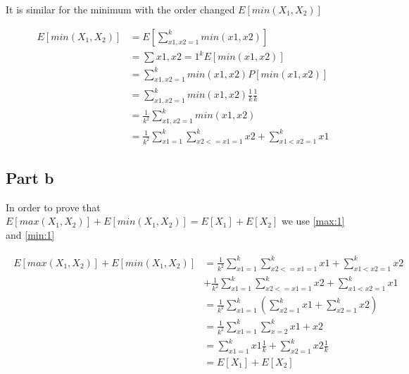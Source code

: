 \documentclass[12pt, a4paper]{article}
\begin{document}
It is similar for the minimum with the order changed $E[min(X_1,X_2)]$

\begin{subequations}
  \begin{align}
    E[min(X_1,X_2)] &= E\left[ \displaystyle\sum_{x1,x2=1}^{k} min(x1,x2) \right] \\
                    &= \displaystyle\sum{x1,x2=1}^{k} E[min(x1,x2)] \\
                    &= \displaystyle\sum_{x1,x2=1}^{k} min(x1,x2)P[min(x1,x2)] \\
                    &= \displaystyle\sum_{x1,x2=1}^{k} min(x1,x2)\frac{1}{k}\frac{1}{k} \\
                    &= \frac{1}{k^2} \displaystyle\sum_{x1,x2=1}^{k} min(x1,x2) \\
                    &= \frac{1}{k^2} \displaystyle\sum_{x1=1}^{k} \displaystyle\sum_{x2<=x1=1}^{k} x2 + \displaystyle\sum_{x1<x2=1}^{k} x1 \label{min:1}
  \end{align}
\end{subequations}


\subsection{Part b} \label{ex_13_part_b}

In order to prove that $E[max(X_1,X_2)] + E[min(X_1,X_2)] = E[X_1] + E[X_2]$ we
use \ref{max:1} and \ref{min:1}

\begin{subequations}
  \begin{align}
    \begin{split}
      E[max(X_1,X_2)] + E[min(X_1,X_2)] &= \frac{1}{k^2} \displaystyle\sum_{x1=1}^{k} \displaystyle\sum_{x2<=x1=1}^{k} x1 + \displaystyle\sum_{x1<x2=1}^{k} x2 \\
      & + \frac{1}{k^2} \displaystyle\sum_{x1=1}^{k} \displaystyle\sum_{x2<=x1=1}^{k} x2 + \displaystyle\sum_{x1<x2=1}^{k} x1 \\
                                      &= \frac{1}{k^2} \displaystyle\sum_{x1=1}^{k} \left( \displaystyle\sum_{x2=1}^{k} x1 + \displaystyle\sum_{x2=1}^{k} x2 \right) \\
                                      &= \frac{1}{k^2} \displaystyle\sum_{x1=1}^{k} \displaystyle\sum_{x=2}^{k} x1 + x2\\
                                      &= \displaystyle\sum_{x1=1}^{k} x1 \frac{1}{k} + \displaystyle\sum_{x2=1}^{k} x2 \frac{1}{k} \\
                                      &= E[X_1] + E[X_2]
                                      \end{split}
  \end{align}
\end{subequations}
\end{document}
